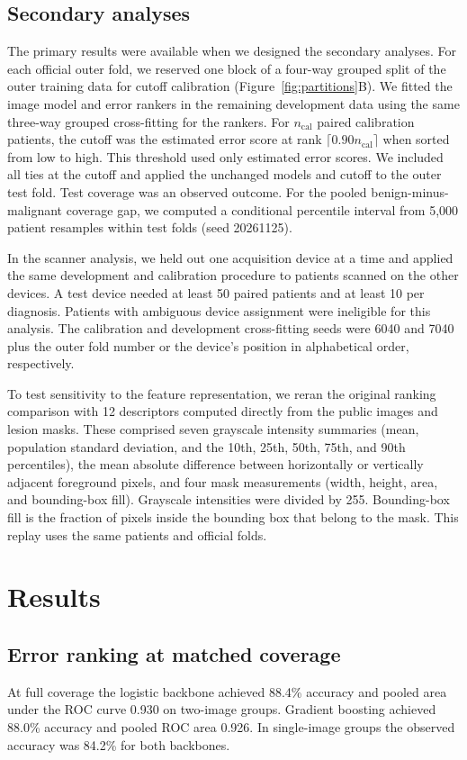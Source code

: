 \documentclass[11pt]{article}
\begin{document}
\subsection{Secondary analyses}
The primary results were available when we designed the secondary analyses. For each official outer fold, we reserved one block of a four-way grouped split of the outer training data for cutoff calibration (Figure~\ref{fig:partitions}B). We fitted the image model and error rankers in the remaining development data using the same three-way grouped cross-fitting for the rankers. For $n_{\mathrm{cal}}$ paired calibration patients, the cutoff was the estimated error score at rank $\lceil 0.90 n_{\mathrm{cal}}\rceil$ when sorted from low to high. This threshold used only estimated error scores. We included all ties at the cutoff and applied the unchanged models and cutoff to the outer test fold. Test coverage was an observed outcome. For the pooled benign-minus-malignant coverage gap, we computed a conditional percentile interval from 5,000 patient resamples within test folds (seed 20261125).

In the scanner analysis, we held out one acquisition device at a time and applied the same development and calibration procedure to patients scanned on the other devices. A test device needed at least 50 paired patients and at least 10 per diagnosis. Patients with ambiguous device assignment were ineligible for this analysis. The calibration and development cross-fitting seeds were 6040 and 7040 plus the outer fold number or the device's position in alphabetical order, respectively.

To test sensitivity to the feature representation, we reran the original ranking comparison with 12 descriptors computed directly from the public images and lesion masks. These comprised seven grayscale intensity summaries (mean, population standard deviation, and the 10th, 25th, 50th, 75th, and 90th percentiles), the mean absolute difference between horizontally or vertically adjacent foreground pixels, and four mask measurements (width, height, area, and bounding-box fill). Grayscale intensities were divided by 255. Bounding-box fill is the fraction of pixels inside the bounding box that belong to the mask. This replay uses the same patients and official folds.

\section{Results}
\subsection{Error ranking at matched coverage}
At full coverage the logistic backbone achieved 88.4\% accuracy and pooled area under the ROC curve 0.930 on two-image groups. Gradient boosting achieved 88.0\% accuracy and pooled ROC area 0.926. In single-image groups the observed accuracy was 84.2\% for both backbones.
\end{document}
